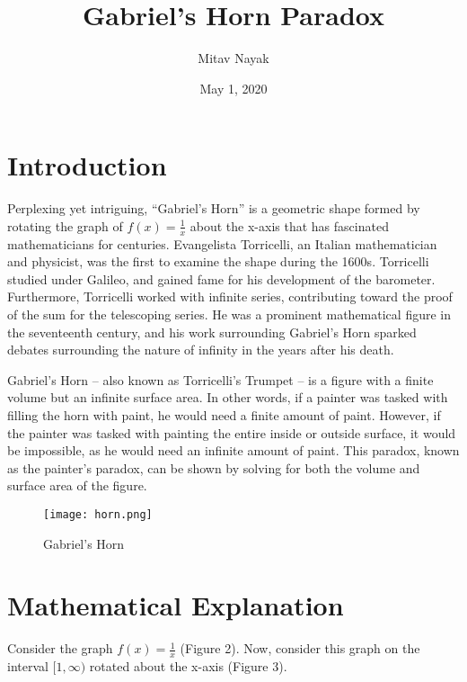 \documentclass{article}
\theoremstyle{definition}
\begin{document}
\title{Gabriel’s Horn Paradox}
\author{Mitav Nayak}
\date{May 1, 2020}
\maketitle

\section{Introduction}

	Perplexing yet intriguing, “Gabriel’s Horn” is a geometric shape formed by rotating the graph of $f(x)=\frac{1}{x}$ about the x-axis that has fascinated mathematicians for centuries. Evangelista Torricelli, an Italian mathematician and physicist, was the first to examine the shape during the 1600s. Torricelli studied under Galileo, and gained fame for his development of the barometer. Furthermore, Torricelli worked with infinite series, contributing toward the proof of the sum for the telescoping series. He was a prominent mathematical figure in the seventeenth century, and his work surrounding Gabriel’s Horn sparked debates surrounding the nature of infinity in the years after his death.

	Gabriel’s Horn – also known as Torricelli’s Trumpet – is a figure with a finite volume but an infinite surface area. In other words, if a painter was tasked with filling the horn with paint, he would need a finite amount of paint. However, if the painter was tasked with painting the entire inside or outside surface, it would be impossible, as he would need an infinite amount of paint. This paradox, known as the painter’s paradox, can be shown by solving for both the volume and surface area of the figure.

\begin{figure}[h!]
  \caption{Gabriel's Horn}
  \begin{center}
    \texttt{[image: horn.png]} 
  \end{center}
\end{figure}


\section{Mathematical Explanation}



	Consider the graph $f(x)=\frac{1}{x}$ (Figure 2). Now, consider this graph on the interval $[1,\infty)$ rotated about the x-axis (Figure 3).
\end{document}

